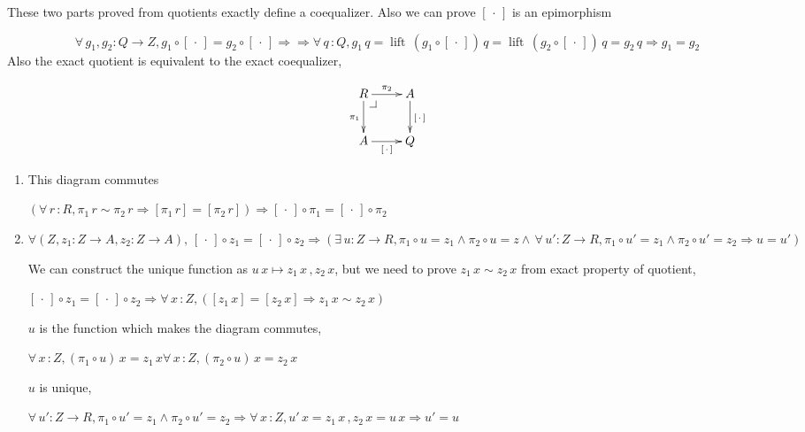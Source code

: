 \documentclass[envcountsame]{llncs}
\makeatletter
\newcommand{\dotph}{\,\cdot\,}
\providecommand{\class}[1]{[#1]}
\DeclareMathOperator{\lift}{lift}
\newcommand{\pullbackcorner}[1][dr]{\save*!/#1-1.2pc/#1:(-1,1)@^{|-}\restore}
\makeatother
\begin{document}
These two parts proved from quotients
exactly define a coequalizer. Also we can prove $\class\dotph$ is an epimorphism

\[ \forall\, g_1,g_2 : Q \to Z, g_1 \circ \class\dotph = g_2 \circ \class\dotph \Rightarrow  

\Rightarrow  \forall \,q \,\colon Q,  g_{1} \,q = \lift \, (g_1 \circ \class\dotph) \, q = \lift \, (g_2 \circ \class\dotph) \, q = g_2\, q \Rightarrow g_1 = g_2

\]
Also the exact quotient is equivalent to the exact coequalizer,

\[\xymatrix{
R\pullbackcorner\ar[r]^{\pi_2}\ar[d]_{\pi_1} & A\ar[d]^{\class\dotph} \\
A\ar[r]_{\class\dotph} & Q
}\]

\begin{enumerate}

\item This diagram commutes

$(\forall \,r\, \colon R, \pi_1 \, r \sim \pi_2 \, r \Rightarrow\class{\pi_1 \,r} = \class{\pi_2 \, r}) \Rightarrow \class\dotph \circ \pi_1 = \class\dotph\circ \pi_2$


\item $\forall (Z , z_1 \colon Z \to A, z_2 \colon Z \to A), \, \class{\dotph} \circ z_1 = \class\dotph \circ z_2 

\Rightarrow( \exists \,u : Z \to R, \pi_1 \circ u = z_1 \wedge  \pi_2 \circ u = z


\wedge \,\forall \,u' \colon Z \to R, \pi_1 \circ u' = z_1 \wedge  \pi_2 \circ u' = z_2 

\Rightarrow u = u')$

We  can construct the unique function as $u \,x \mapsto z_1 \,x \,, z_2\, x$, but we need to prove $z_1 \,x\sim z_2 \,x$ from exact property of quotient, 

$\class{\dotph} \circ z_1 = \class\dotph \circ z_2 \Rightarrow \forall \,x\, \colon Z, (\class{z_1\,x}=\class{z_2 \,x} \Rightarrow z_{1} \,x \sim z_2 \, x) $

$u$ is the function which makes the diagram commutes,

$\forall \,x\,\colon Z, (\pi_1 \circ u) \, x = z_1 \,x

\forall \,x\,\colon Z, (\pi_2 \circ u) \, x = z_2 \,x$

$u$ is unique,

$\forall \,u' \colon Z \to R, \pi_1 \circ u' = z_1 \wedge  \pi_2 \circ u'  = z_2 
 
 \Rightarrow \forall \,x\,\colon Z, u' \,x = z_1 \,x\,,z_2\,x=u\,x \Rightarrow u' = u$


\end{enumerate}
\end{document}
